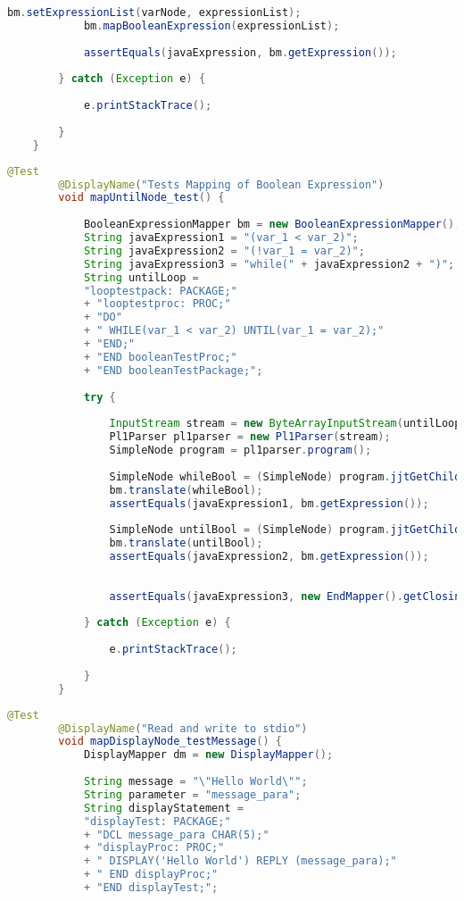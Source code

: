 \begin{appendices}
\begin{lstlisting}[language=Java,caption=Boolean-Expression Test]
			bm.setExpressionList(varNode, expressionList);
			bm.mapBooleanExpression(expressionList);
			
			assertEquals(javaExpression, bm.getExpression());
			
		} catch (Exception e) {
			
			e.printStackTrace();
			
		}
	}
	\end{lstlisting}
\pagebreak
	\begin{lstlisting}[language=Java, caption=Until-Loop Test]
		@Test
		@DisplayName("Tests Mapping of Boolean Expression")
		void mapUntilNode_test() {
			
			BooleanExpressionMapper bm = new BooleanExpressionMapper();
			String javaExpression1 = "(var_1 < var_2)";
			String javaExpression2 = "(!var_1 = var_2)";
			String javaExpression3 = "while(" + javaExpression2 + ")";
			String untilLoop = 
			"looptestpack: PACKAGE;"
			+ "looptestproc: PROC;"
			+ "DO"
			+ "	WHILE(var_1 < var_2) UNTIL(var_1 = var_2);"
			+ "END;"
			+ "END booleanTestProc;"
			+ "END booleanTestPackage;";
			
			try {
				
				InputStream stream = new ByteArrayInputStream(untilLoop.getBytes(StandardCharsets.UTF_8));
				Pl1Parser pl1parser = new Pl1Parser(stream);
				SimpleNode program = pl1parser.program();
				
				SimpleNode whileBool = (SimpleNode) program.jjtGetChild(0).jjtGetChild(0).jjtGetChild(0).jjtGetChild(0);
				bm.translate(whileBool);
				assertEquals(javaExpression1, bm.getExpression());
				
				SimpleNode untilBool = (SimpleNode) program.jjtGetChild(0).jjtGetChild(0).jjtGetChild(0).jjtGetChild(1).jjtGetChild(0);
				bm.translate(untilBool);
				assertEquals(javaExpression2, bm.getExpression());
				
				
				assertEquals(javaExpression3, new EndMapper().getClosingExpression());
				
			} catch (Exception e) {
				
				e.printStackTrace();
				
			}
		}
	\end{lstlisting}
\pagebreak
	\begin{lstlisting}[language=Java, caption=Display-Statement Test]
		@Test
		@DisplayName("Read and write to stdio")
		void mapDisplayNode_testMessage() {
			DisplayMapper dm = new DisplayMapper();
			
			String message = "\"Hello World\"";
			String parameter = "message_para";
			String displayStatement = 
			"displayTest: PACKAGE;"
			+ "DCL message_para CHAR(5);"
			+ "displayProc: PROC;"
			+ " DISPLAY('Hello World') REPLY (message_para);"
			+ " END displayProc;"
			+ "END displayTest;";
			

\end{lstlisting}
\end{appendices}
